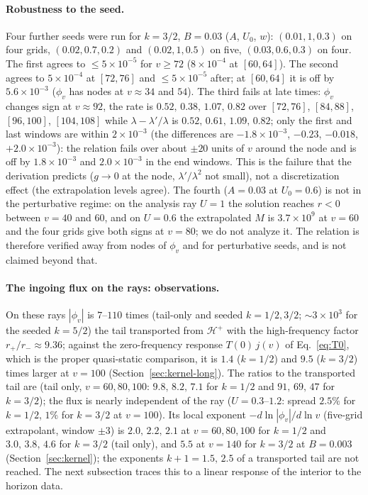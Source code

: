 \documentclass[11pt]{article}
\begin{document}
\paragraph{Robustness to the seed.} Four further seeds were run for $k=3/2$, $B=0.03$ ($A$, $U_0$, $w$): $(0.01,1,0.3)$ on four grids, $(0.02,0.7,0.2)$ and $(0.02,1,0.5)$ on five, $(0.03,0.6,0.3)$ on four. The first agrees to $\le5\times10^{-5}$ for $v\ge72$ ($8\times10^{-4}$ at $[60,64]$). The second agrees to $5\times10^{-4}$ at $[72,76]$ and $\le5\times10^{-5}$ after; at $[60,64]$ it is off by $5.6\times10^{-3}$ ($\phi_v$ has nodes at $v\approx34$ and $54$). The third fails at late times: $\phi_v$ changes sign at $v\approx92$, the rate is $0.52,\,0.38,\,1.07,\,0.82$ over $[72,76]$, $[84,88]$, $[96,100]$, $[104,108]$ while $\lambda-\lambda'/\lambda$ is $0.52,\,0.61,\,1.09,\,0.82$; only the first and last windows are within $2\times10^{-3}$ (the differences are $-1.8\times10^{-3}$, $-0.23$, $-0.018$, $+2.0\times10^{-3}$): the relation fails over about $\pm20$ units of $v$ around the node and is off by $1.8\times10^{-3}$ and $2.0\times10^{-3}$ in the end windows. This is the failure that the derivation predicts ($g\to0$ at the node, $\lambda'/\lambda^2$ not small), not a discretization effect (the extrapolation levels agree). The fourth ($A=0.03$ at $U_0=0.6$) is not in the perturbative regime: on the analysis ray $U=1$ the solution reaches $r<0$ between $v=40$ and $60$, and on $U=0.6$ the extrapolated $M$ is $3.7\times10^{9}$ at $v=60$ and the four grids give both signs at $v=80$; we do not analyze it. The relation is therefore verified away from nodes of $\phi_v$ and for perturbative seeds, and is not claimed beyond that.

\paragraph{The ingoing flux on the rays: observations.} On these rays $|\phi_v|$ is $7$--$110$ times (tail-only and seeded $k=1/2,3/2$; $\sim3\times10^{3}$ for the seeded $k=5/2$) the tail transported from $\mathcal H^+$ with the high-frequency factor $r_+/r_-\approx9.36$; against the zero-frequency response $T(0)\,j(v)$ of Eq.~\eqref{eq:T0}, which is the proper quasi-static comparison, it is $1.4$ ($k=1/2$) and $9.5$ ($k=3/2$) times larger at $v=100$ (Section~\ref{sec:kernel-long}). The ratios to the transported tail are (tail only, $v=60,80,100$: $9.8,\,8.2,\,7.1$ for $k=1/2$ and $91,\,69,\,47$ for $k=3/2$); the flux is nearly independent of the ray ($U=0.3$--$1.2$: spread $2.5\%$ for $k=1/2$, $1\%$ for $k=3/2$ at $v=100$). Its local exponent $-d\ln|\phi_v|/d\ln v$ (five-grid extrapolant, window $\pm3$) is $2.0,\,2.2,\,2.1$ at $v=60,80,100$ for $k=1/2$ and $3.0,\,3.8,\,4.6$ for $k=3/2$ (tail only), and $5.5$ at $v=140$ for $k=3/2$ at $B=0.003$ (Section~\ref{sec:kernel}); the exponents $k+1=1.5,\,2.5$ of a transported tail are not reached. The next subsection traces this to a linear response of the interior to the horizon data.
\end{document}
